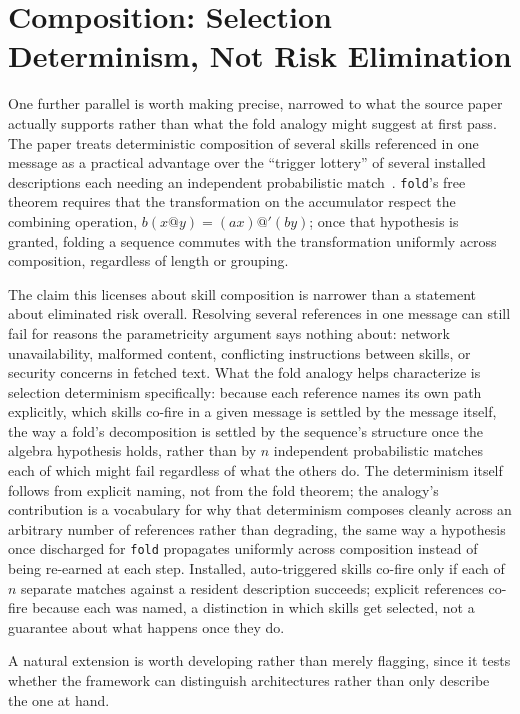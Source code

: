 \documentclass[11pt]{article}
\begin{document}
\section{Composition: Selection Determinism, Not Risk Elimination}
\label{sec:composition}

One further parallel is worth making precise, narrowed to what the source paper actually supports rather than what the fold analogy might suggest at first pass. The paper treats deterministic composition of several skills referenced in one message as a practical advantage over the ``trigger lottery'' of several installed descriptions each needing an independent probabilistic match~\cite{skills2026}. \texttt{fold}'s free theorem requires that the transformation on the accumulator respect the combining operation, $b(x @ y) = (ax) @' (by)$; once that hypothesis is granted, folding a sequence commutes with the transformation uniformly across composition, regardless of length or grouping.

The claim this licenses about skill composition is narrower than a statement about eliminated risk overall. Resolving several references in one message can still fail for reasons the parametricity argument says nothing about: network unavailability, malformed content, conflicting instructions between skills, or security concerns in fetched text. What the fold analogy helps characterize is selection determinism specifically: because each reference names its own path explicitly, which skills co-fire in a given message is settled by the message itself, the way a fold's decomposition is settled by the sequence's structure once the algebra hypothesis holds, rather than by $n$ independent probabilistic matches each of which might fail regardless of what the others do. The determinism itself follows from explicit naming, not from the fold theorem; the analogy's contribution is a vocabulary for why that determinism composes cleanly across an arbitrary number of references rather than degrading, the same way a hypothesis once discharged for \texttt{fold} propagates uniformly across composition instead of being re-earned at each step. Installed, auto-triggered skills co-fire only if each of $n$ separate matches against a resident description succeeds; explicit references co-fire because each was named, a distinction in which skills get selected, not a guarantee about what happens once they do.

A natural extension is worth developing rather than merely flagging, since it tests whether the framework can distinguish architectures rather than only describe the one at hand.
\end{document}

